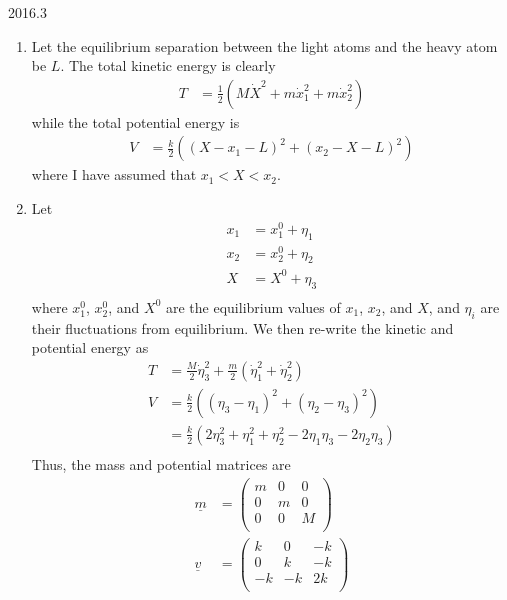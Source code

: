 \documentclass[12pt]{article}
\begin{document}
\begin{solution}{2016.3}
\begin{enumerate}
\item
Let the equilibrium separation between the light atoms and the heavy atom be $L$.
The total kinetic energy is clearly
\begin{align*}
T & = \frac{1}{2} \left( M \dot{X}^2 + m \dot{x}_1^2 + m \dot{x}_2^2 \right)
\end{align*}
while the total potential energy is
\begin{align*}
V & = \frac{k}{2} \left( (X - x_1 - L)^2 + (x_2 - X - L)^2 \right)
\end{align*}
where I have assumed that $x_1 < X < x_2$.

\item
Let
\begin{align*}
x_1 & = x_1^0 + \eta_1 \\
x_2 & = x_2^0 + \eta_2 \\
X   & =   X^0 + \eta_3 \\
\end{align*}
where $x_1^0$, $x_2^0$, and $X^0$ are the equilibrium values of $x_1$, $x_2$, and $X$, and $\eta_i$ are their fluctuations from equilibrium.
We then re-write the kinetic and potential energy as
\begin{align*}
T & = \frac{M}{2} \dot{\eta}_3^2 + \frac{m}{2} (\dot{\eta}_1^2 + \dot{\eta}_2^2) \\
V & = \frac{k}{2} \left( (\eta_3 - \eta_1)^2 + (\eta_2 - \eta_3)^2 \right) \\
& = \frac{k}{2} \left( 2\eta_3^2 + \eta_1^2 + \eta_2^2 - 2\eta_1 \eta_3 - 2\eta_2 \eta_3 \right) \\
\end{align*}
Thus, the mass and potential matrices are
\begin{align*}
\underline{m} & = \left( \begin{array}{ccc}
m & 0 & 0 \\
0 & m & 0 \\
0 & 0 & M \\
\end{array} \right) \\
\underline{v} & = \left( \begin{array}{ccc}
k & 0 & -k \\
0 & k & -k \\
-k & -k & 2k \\
\end{array} \right)
\end{align*}

\end{enumerate}
\end{solution}
\end{document}
